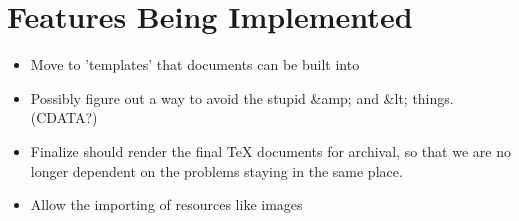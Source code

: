 \section{Features Being Implemented}
  \begin{itemize}
    \item Move to 'templates' that documents can be built into 
    \item Possibly figure out a way to avoid the stupid \&amp; and \&lt; things.
    (CDATA?)
    \item Finalize should render the final TeX documents for archival, so that 
    we are no longer dependent on the problems staying in the same place.
    \item Allow the importing of resources like images
  \end{itemize}